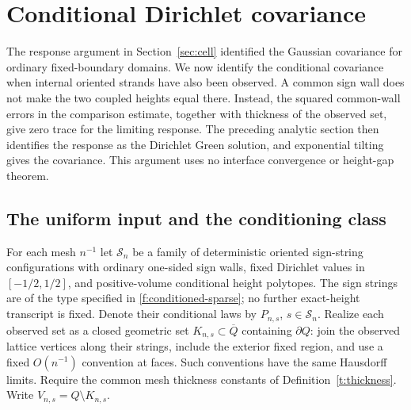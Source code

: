 \section{Conditional Dirichlet covariance}\label{sec:conditional-covariance}

The response argument in Section~\ref{sec:cell} identified the Gaussian
covariance for ordinary fixed-boundary domains. We now identify the
conditional covariance when internal oriented strands have also been
observed. A common sign wall does not make the two coupled heights equal
there. Instead, the squared common-wall errors in the comparison estimate,
together with thickness of the observed set, give zero trace for the
limiting response. The preceding analytic section then identifies the
response as the Dirichlet Green solution, and exponential tilting gives
the covariance.
This argument uses no interface convergence or height-gap theorem.

\subsection{The uniform input and the conditioning class}

For each mesh $n^{-1}$ let $\mathcal S_n$ be a family of deterministic
oriented sign-string configurations with ordinary one-sided sign walls,
fixed Dirichlet values in $[-1/2,1/2]$, and positive-volume conditional
height polytopes.  The sign strings are of the type specified in
\ref{f:conditioned-sparse}; no further exact-height transcript is fixed.
Denote their conditional
laws by $P_{n,s}$, $s\in\mathcal S_n$.  Realize each observed set as a
closed geometric set $K_{n,s}\subset\overline Q$ containing $\partial Q$:
join the observed lattice vertices along their strings, include the
exterior fixed region, and use a fixed $O(n^{-1})$ convention at faces.
Such conventions have the same Hausdorff limits.  Require the common
mesh thickness constants of Definition~\ref{t:thickness}.  Write
$V_{n,s}=Q\setminus K_{n,s}$.

